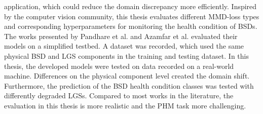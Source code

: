 application, which could reduce the domain discrepancy more efficiently. Inspired by the computer vision community, this thesis evaluates different MMD-loss types and corresponding hyperparameters for monitoring the health condition of BSDs. The works presented by Pandhare et al. \cite{Pandhare2021} and Azamfar et al. \cite{AZAMFAR2020103932} evaluated their models on a simplified testbed. A dataset was recorded, which used the same physical BSD and LGS components in the training and testing dataset. In this thesis, the developed models were tested on data recorded on a real-world machine. Differences on the physical component level created the domain shift. Furthermore, the prediction of the BSD health condition classes was tested with differently degraded LGSs. Compared to most works in the literature, the evaluation in this thesis is more realistic and the PHM task more challenging. 
